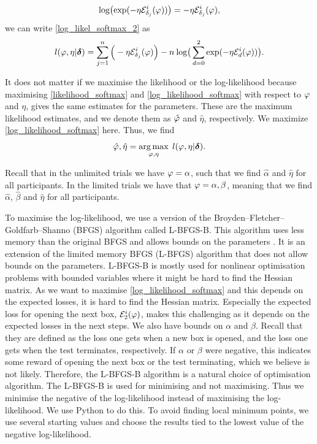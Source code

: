 \begin{equation*}
    \text{log} \big( \text{exp}(- \eta \mathcal{E}^i_{\delta_{j}}(\varphi))\big)
    = - \eta \mathcal{E}^i_{\delta_{j}}(\varphi),
\end{equation*}
we can write \eqref{log_likel_softmax_2} as
\begin{equation}
\label{log_likelihood_softmax}
    \begin{aligned}
       l(\varphi,\eta|\boldsymbol{\delta})
       = \sum_{j=1}^n \Big( - \eta \mathcal{E}^i_{\delta_{j}}(\varphi) \Big)
       - n \: \text{log} \big( \sum_{d=0}^{2} \text{exp}(-\eta \mathcal{E}^i_{d}(\varphi)) \big).
    \end{aligned}
\end{equation}

It does not matter if we maximise the likelihood or the log-likelihood because maximising \eqref{likelihood_softmax} and \eqref{log_likelihood_softmax} with respect to $\varphi$ and $\eta$, gives the same estimates for the parameters. These are the maximum likelihood estimates, and we denote them as $\hat{\varphi}$ and $\hat{\eta}$, respectively. We maximize \eqref{log_likelihood_softmax} here. Thus, we find
\begin{equation}
    \hat{\varphi},\hat{\eta} = \underset{\varphi,\eta}{\mathrm{arg}\,\mathrm{max}}\:\: l(\varphi,\eta|\boldsymbol{\delta}) .
\end{equation}

Recall that in the unlimited trials we have $\varphi=\alpha$, such that we find $\hat{\alpha}$ and $\hat{\eta}$ for all participants. In the limited trials we have that $\varphi=\alpha,\beta$, meaning that we find $\hat{\alpha}$, $\hat{\beta}$ and $\hat{\eta}$ for all participants.

To maximise the log-likelihood, we use a version of the Broyden–Fletcher– Goldfarb–Shanno (BFGS) algorithm called L-BFGS-B. This algorithm uses less memory than the original BFGS and allows bounds on the parameters \citep{optimization2}. It is an extension of the limited memory BFGS (L-BFGS) algorithm that does not allow bounds on the parameters. L-BFGS-B is mostly used for nonlinear optimisation problems with bounded variables where it might be hard to find the Hessian matrix. 
As we want to maximise \eqref{log_likelihood_softmax} and this depends on the expected losses, it is hard to find the Hessian matrix. Especially the expected loss for opening the next box, $\mathcal{E}_2^i(\varphi)$, makes this challenging as it depends on the expected losses in the next steps. We also have bounds on $\alpha$ and $\beta$. Recall that they are defined as the loss one gets when a new box is opened, and the loss one gets when the test terminates, respectively. If $\alpha$ or $\beta$ were negative, this indicates some reward of opening the next box or the test terminating, which we believe is not likely. Therefore, the L-BFGS-B algorithm is a natural choice of optimisation algorithm. The L-BFGS-B is used for minimising and not maximising. Thus we minimise the negative of the log-likelihood instead of maximising the log-likelihood. We use Python to do this. To avoid finding local minimum points, we use several starting values and choose the results tied to the lowest value of the negative log-likelihood. 

